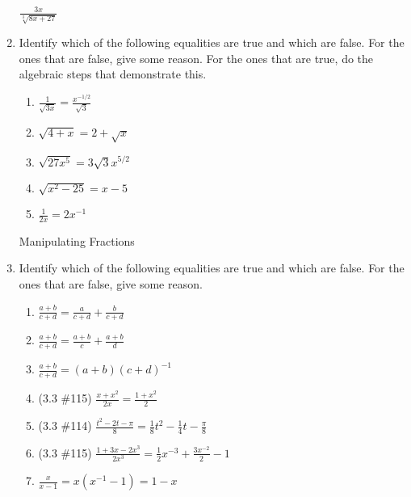 \documentclass[11pt,fleqn]{article}
\begin{document}
\begin{enumerate}
	$\frac{3x}{\sqrt[3]{8x+27}}$\\ 
	\vfill
	
\newpage
\item Identify which of the following equalities are true and which are false. For the ones that are false, give some reason. For the ones that are true, do the algebraic steps that demonstrate this.
	\begin{enumerate}
	\item $\frac{1}{\sqrt{3x}}=\frac{x^{-1/2}}{\sqrt{3}}$\\ \vfill
	\item $\sqrt{4+x}=2+\sqrt{x}$\\ \vfill
	\item $\sqrt{27x^5}=3\sqrt{3}x^{5/2}$\\ \vfill
	\item $\sqrt{x^2-25}=x-5$ \\ \vfill
	\item $\frac{1}{2x}=2x^{-1}$\\ \vfill
	\end{enumerate}
	
Manipulating Fractions
\item Identify which of the following equalities are true and which are false. For the ones that are false, give some reason. 
	\begin{enumerate}
	\item $\frac{a+b}{c+d}=\frac{a}{c+d}+\frac{b}{c+d}$\\ \vfill
	\item $\frac{a+b}{c+d}=\frac{a+b}{c}+\frac{a+b}{d}$\\ \vfill
	\item $\frac{a+b}{c+d}=(a+b)(c+d)^{-1}$\\ \vfill
	\item (3.3 \#115) $\frac{x+x^2}{2x}=\frac{1+x^2}{2}$ \\ \vfill
	\item (3.3 \#114) $\frac{t^2-2t-\pi}{8}=\frac{1}{8}t^2-\frac{1}{4}t-\frac{\pi}{8}$ \\ \vfill
	\item (3.3 \#115) $\frac{1+3x-2x^3}{2x^3}=\frac{1}{2}x^{-3}+\frac{3x^{-2}}{2}-1$ \\ \vfill

	\item $\frac{x}{x-1}=x(x^{-1}-1)=1-x$\\ \vfill
	\end{enumerate}
\end{enumerate}
\end{document}
